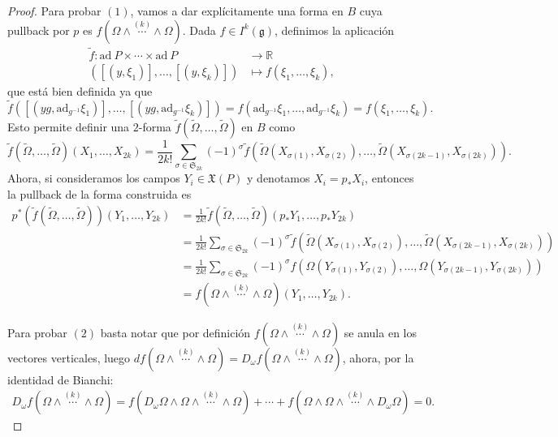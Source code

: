 \documentclass[12pt,a4paper]{article}
\theoremstyle{definition} \newtheorem{defn}[thm]{Definición}
\theoremstyle{definition} \newtheorem{ejemplo}[thm]{Ejemplo}
\theoremstyle{definition} \newtheorem{ejercicio}[thm]{Ejercicio}
\theoremstyle{remark} \newtheorem*{obs}{Observación}
\def\gg{\mathfrak{g}}
\def\ad{\mathrm{ad}}
\def\RR{\mathbb{R}}
\begin{document}
	   \begin{proof}
	Para probar $(1)$, vamos a dar explícitamente una forma en $B$ cuya pullback por $p$ es $f( \Omega\wedge \overset{(k)}{\cdots} \wedge \Omega)$. Dada $f\in I^k(\gg)$, definimos la aplicación
	\begin{align*}
	  \tilde{f} :\ad\ P \times \cdots \times \ad\ P&\longrightarrow \RR\\ 
	  ([(y,\xi_1)],\dots,[(y,\xi_k)]) &\longmapsto f(\xi_1,\dots,\xi_k), 
	  \end{align*}
	  que está bien definida ya que 
	  \begin{equation*}
	    \tilde{f}([(yg,\ad_{g^{-1}}\xi_1)],\dots,[(yg,\ad_{g^{-1}}\xi_k)])=f(\ad_{g^{-1}}\xi_1,\dots,\ad_{g^{-1}}\xi_k)=f(\xi_1,\dots,\xi_k).
	  \end{equation*}
	  Esto permite definir una $2$-forma $\tilde{f}(\tilde{\Omega},\dots,\tilde{\Omega})$ en $B$ como
	  \begin{equation*}
	    \tilde{f}(\tilde{\Omega},\dots,\tilde{\Omega})(X_1,\dots,X_{2k})=\frac{1}{2k!}\sum_{\sigma \in \mathfrak{S}_{2k}}(-1)^{\sigma} \tilde{f}(\tilde{\Omega}(X_{\sigma(1)},X_{\sigma(2)}),\dots,\tilde{\Omega}(X_{\sigma(2k-1)},X_{\sigma(2k)})).
	  \end{equation*}
	  Ahora, si consideramos los campos $Y_i \in \mathfrak{X}(P)$ y denotamos $X_i=p_*X_i$, entonces la pullback de la forma construida es
	  \begin{align*}
	    p^*(\tilde{f}(\tilde{\Omega},\dots,\tilde{\Omega}))(Y_1,\dots,Y_{2k})&=\frac{1}{2k!}\tilde{f}(\tilde{\Omega},\dots,\tilde{\Omega})(p_*Y_1,\dots,p_*Y_{2k})\\&=\frac{1}{2k!}\sum_{\sigma \in \mathfrak{S}_{2k}}(-1)^{\sigma} \tilde{f}(\tilde{\Omega}(X_{\sigma(1)},X_{\sigma(2)}),\dots,\tilde{\Omega}(X_{\sigma(2k-1)},X_{\sigma(2k)}))\\
	    &=\frac{1}{2k!}\sum_{\sigma \in \mathfrak{S}_{2k}}(-1)^{\sigma} f(\Omega(Y_{\sigma(1)},Y_{\sigma(2)}),\dots,\Omega(Y_{\sigma(2k-1)},Y_{\sigma(2k)}))\\
	    &= f(\Omega \wedge \overset{(k)}{\cdots} \wedge \Omega)(Y_1,\dots,Y_{2k}).
	  \end{align*}
	  
	  Para probar $(2)$ basta notar que por definición $f(\Omega \wedge \overset{(k)}{\cdots} \wedge \Omega)$ se anula en los vectores verticales, luego $df(\Omega \wedge \overset{(k)}{\cdots} \wedge \Omega)=D_\omega f(\Omega \wedge \overset{(k)}{\cdots} \wedge \Omega)$, ahora, por la identidad de Bianchi:
	  \begin{align*}
	    D_\omega f(\Omega \wedge \overset{(k)}{\cdots} \wedge \Omega)
	    =f(D_\omega\Omega \wedge \Omega \wedge \overset{(k)}{\cdots} \wedge \Omega)+\cdots+f(\Omega \wedge \Omega \wedge \overset{(k)}{\cdots} \wedge D_\omega \Omega)=0.
	  \end{align*}


\end{proof}
\end{document}
